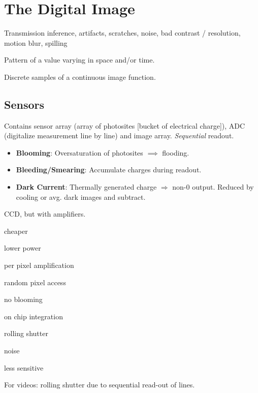 \section{The Digital Image}

\begin{definition}[Problems]
   Transmission inference, artifacts, scratches, noise, bad contrast / resolution, motion blur, spilling
\end{definition}

\begin{definition}[Image]
  Pattern of a value varying in space and/or time.
\end{definition}

\begin{definition}[Pixel]
  Discrete samples of a continuous image function.
\end{definition}

\subsection{Sensors}
\begin{definition}
  Contains sensor array (array of photosites [bucket of electrical charge]), ADC (digitalize measurement line by line) and image array. \textit{Sequential} readout.
  \begin{itemize}[label=-]
    \item \textbf{Blooming}: Oversaturation of photosites \(\implies\) flooding.
    \item \textbf{Bleeding/Smearing}: Accumulate charges during readout.
    \item \textbf{Dark Current}: Thermally generated charge \(\Rightarrow\) non-0 output. Reduced by cooling or avg. dark images and subtract.
  \end{itemize}
\end{definition}

\begin{definition}[CMOS]
  CCD, but with amplifiers.
  \begin{itemize*}
    \item cheaper
    \item lower power
    \item per pixel amplification
    \item random pixel access
    \item no blooming
    \item on chip integration
    \item rolling shutter
    \item noise
    \item less sensitive
  \end{itemize*}

  For videos: rolling shutter due to sequential read-out of lines.
\end{definition}

